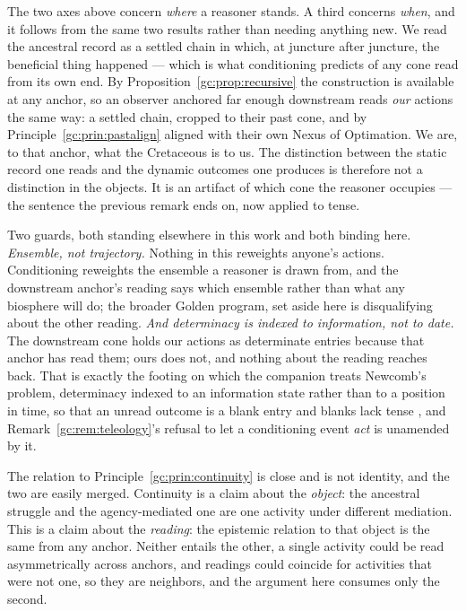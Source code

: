 \begin{remark}\label{gc:rem:notense}
The two axes above concern \emph{where} a reasoner stands. A third
concerns \emph{when}, and it follows from the same two results rather
than needing anything new. We read the ancestral record as a settled chain in which, at juncture
after juncture, the beneficial thing happened --- which is what
conditioning predicts of any cone read from its own end. By
Proposition~\ref{gc:prop:recursive} the construction is available at any
anchor, so an observer anchored far enough downstream reads \emph{our}
actions the same way: a settled chain, cropped to their past cone, and by
Principle~\ref{gc:prin:pastalign} aligned with their own Nexus of
Optimation. We are, to that anchor, what the Cretaceous is to us. The
distinction between the static record one reads and the dynamic outcomes
one produces is therefore not a distinction in the objects. It is an
artifact of which cone the reasoner occupies --- the sentence the
previous remark ends on, now applied to tense.

Two guards, both standing elsewhere in this work and both binding here. \emph{Ensemble, not trajectory.} Nothing in this reweights anyone's
actions. Conditioning reweights the ensemble a reasoner is drawn from,
and the downstream anchor's reading says which ensemble rather than what
any biosphere will do; the broader Golden program, set aside here is disqualifying about
the other reading. \emph{And determinacy is indexed to information, not to date.} The
downstream cone holds our actions as determinate entries because that
anchor has read them; ours does not, and nothing about the reading
reaches back. That is exactly the footing on which the companion treats
Newcomb's problem, determinacy indexed to an information state rather
than to a position in time, so that an unread outcome is a blank entry
and blanks lack tense \cite{AethusDecision}, and
Remark~\ref{gc:rem:teleology}'s refusal to let a conditioning event
\emph{act} is unamended by it.

The relation to Principle~\ref{gc:prin:continuity} is close and is not
identity, and the two are easily merged.
Continuity is a claim about the \emph{object}: the ancestral struggle and
the agency-mediated one are one activity under different mediation. This
is a claim about the \emph{reading}: the epistemic relation to that
object is the same from any anchor. Neither entails the other, a
single activity could be read asymmetrically across anchors, and
readings could coincide for activities that were not one, so they are
neighbors, and the argument here consumes only the second.
\end{remark}



